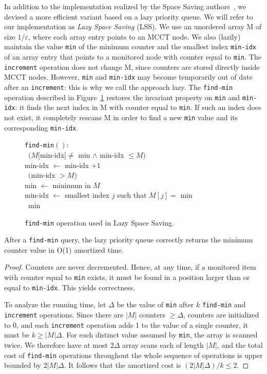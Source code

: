 \documentclass{sigplanconf}
\begin{document}
In addition to the implementation realized by the Space Saving authors~\cite{MAA06}, we devised a more efficient variant based on a lazy priority queue. We will refer to our implementation as {\em Lazy Space Saving} (LSS). We use an unordered array M of size $1/\varepsilon$, where each array entry points to an MCCT node. We also (lazily) maintain the value {\tt min} of the minimum counter and the smallest index {\tt min-idx} of an array entry that points to a monitored node with counter equal to {\tt min}. The {\tt increment} operation does not change M, since counters are stored directly inside MCCT nodes. However, {\tt min} and {\tt min-idx} may become temporarily out of date after an {\tt increment}: this is why we call the approach lazy. The {\tt find-min} operation described in Figure~\ref{fig:findMin} restores the invariant property on {\tt min} and {\tt min-idx}: it finds the next index in M with counter equal to {\tt min}. If such an index does not exist, it completely rescans M in order to find a new {\tt min} value and its corresponding {\tt min-idx}.

\begin{figure}[t]
\begin{frameprog}{\columnwidth}{}
{\tt find-min}$()$: \\
\N \> \WHILE\ $( M[$min-idx$] \neq$ min $\wedge$ min-idx $\leq M )$ \DO \\
\N \> \> min-idx $\gets$ min-idx $+ 1$ \\
\N \> \IF\ $($min-idx $> M)$ \THEN \\
\N \> \> min $\gets$ minimum in $M$ \\
\N \> \> min-idx $\gets$ smallest index $j$ such that $M[j] =$ min \\
\N \> \RETURN\ min \\
\end{frameprog}
\caption{{\tt find-min} operation used in Lazy Space Saving.}
\label{fig:findMin}
\end{figure} 

\begin{lemma}
After a {\tt find-min} query, the lazy priority queue correctly returns the minimum counter value in O(1) amortized time.
\end{lemma}
\begin{proof}
Counters are never decremented. Hence, at any time, if a monitored item with counter equal to {\tt min} exists, it must be found in a position larger than or equal to {\tt min-idx}. This yields correctness.

To analyze the running time, let $\Delta$ be the value of {\tt min} after $k$ {\tt find-min} and {\tt increment} operations. Since there are $|M|$ counters $\ge\Delta$, counters are initialized to $0$, and each {\tt increment} operation adds 1 to the value of a single counter, it must be $k\ge |M|\Delta$. For each distinct value assumed by {\tt min}, the array is scanned twice. We therefore have at most $2\Delta$ array scans each of length $|M|$, and the total cost of {\tt find-min} operations throughout the whole sequence of operations is upper bounded by $2|M|\Delta$. It follows that the amortized cost is $(2|M|\Delta)/k\leq 2$.
\end{proof}
\end{document}
